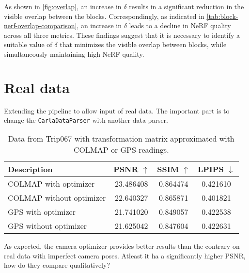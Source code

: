 


As shown in \autoref{fig:overlap}, an increase in $\delta$ results in a significant reduction in the visible overlap between the blocks. Correspondingly, as indicated in \autoref{tab:block-nerf-overlap-comparison}, an increase in $\delta$ leads to a decline in NeRF quality across all three metrics. These findings suggest that it is necessary to identify a suitable value of $\delta$ that minimizes the visible overlap between blocks, while simultaneously maintaining high NeRF quality.
















\section{Real data}
Extending the pipeline to allow input of real data. The important part is to change the \texttt{CarlaDataParser} with another data parser.


\begin{table}[ht]
\centering
\setlength{\tabcolsep}{6pt}
\renewcommand{\arraystretch}{1.5}
\begin{tabular}{l | C{2.2} C{1.3} C{1.3}}
\hline
\textbf{Description} & \textbf{PSNR $\uparrow$} & \textbf{SSIM $\uparrow$} & \textbf{LPIPS $\downarrow$} \\
\hline
COLMAP with optimizer    & 23.486408 & 0.864474 & 0.421610 \\
COLMAP without optimizer & 22.640327 & 0.865871 & 0.401821 \\
GPS with optimizer       & 21.741020 & 0.849057 & 0.422538 \\
GPS without optimizer    & 21.625042 & 0.847604 & 0.422631 \\
\hline
\end{tabular}
\caption{Data from Trip067 with transformation matrix approximated with COLMAP or GPS-readings.}
\label{}
\end{table}





As expected, the camera optimizer provides better results than the contrary on real data with imperfect camera poses. Atleast it ha a significantly higher PSNR, how do they compare qualitatively?